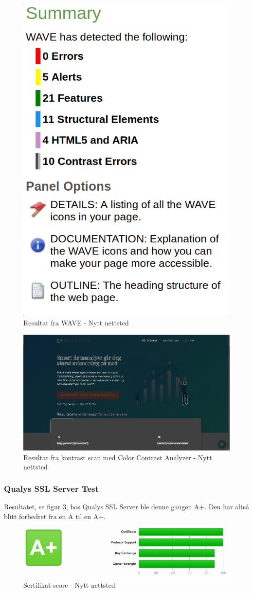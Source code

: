 \begin{figure}[H]
    \centering
    \includegraphics[width=.3\textwidth]{bjornar/wave-new.png}
    \caption{Resultat fra WAVE - Nytt nettsted}
    \label{fig:analysis-new-wave-summary}
\end{figure}

\begin{figure}[H]
    \centering
    \includegraphics[width=\textwidth]{bjornar/contrast-new.png}
    \caption{Resultat fra kontrast scan med Color Contrast Analyzer - Nytt nettsted}
    \label{fig:analysis-new-contrast}
\end{figure}

\subsubsection{Qualys SSL Server Test}
Resultatet, se figur \ref{fig:analysis-new-ssl-test}, hos Qualys SSL Server ble denne gangen A+. Den har altså blitt forbedret fra en A til en A+.

\begin{figure}[H]
    \centering
    \includegraphics[width=\textwidth]{bereket/QSST-test.png}
    \caption{Sertifikat score - Nytt nettsted}
    \label{fig:analysis-new-ssl-test}
\end{figure}

